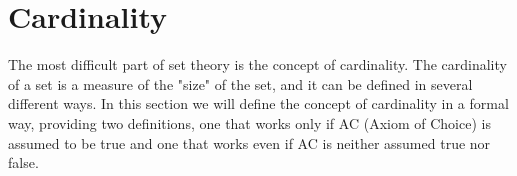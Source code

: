 \section{Cardinality}
The most difficult part of set theory is the concept of cardinality. The cardinality of a set is 
a measure of the "size" of the set, and it can be defined in several different ways. In this 
section we will define the concept of cardinality in a formal way, providing two definitions, one 
that works only if AC (Axiom of Choice) is assumed to be true and one that works 
even if AC is neither assumed true nor false.


